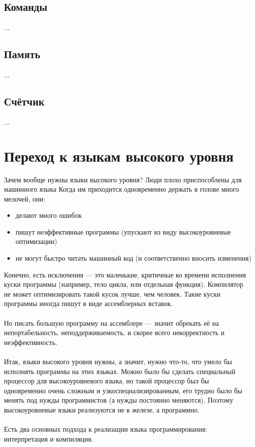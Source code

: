 \documentclass[11pt]{book}
\begin{document}
\section{Команды}
...
\section{Память}
...
\section{Счётчик}
...



\chapter{Переход к языкам высокого уровня}
Зачем вообще нужны языки высокого уровня?
Люди плохо приспособлены для машинного языка
Когда им приходится одновременно держать в голове много мелочей, они:
\begin{itemize}
\item делают много ошибок
\item пишут неэффективные программы (упускают из виду высокоуровневые оптимизации)
\item не могут быстро читать машинный код (и соответственно вносить изменения)
\end{itemize}
Конечно, есть исключения --- это маленькие, критичные ко времени исполнения куски программы (например, тело цикла, или отдельная функция).
Компилятор не может оптимизировать такой кусок лучше, чем человек.
Такие куски программы иногда пишут в виде ассемблерных вставок.
\\ \\
Но писать большую программу на ассемблере --- значит обрекать её на непортабельность, неподдерживаемость,
и скорее всего некорректность и неэффективность.
\\ \\
Итак, языки высокого уровня нужны, а значит, нужно что-то, что умело бы исполнять программы на этих языках.
Можно было бы сделать специальный процессор для высокоуровневого языка,
но такой процессор был бы одновременно очень сложным и узкоспециализированным,
его трудно было бы менять под нужды программистов (а нужды постоянно меняются).
Поэтому высокоуровневые языки реализуются не в железе, а программно.
\\ \\
Есть два основных подхода к реализации языка программирования: интерпретация и компиляция.
\\ \\
\end{document}

